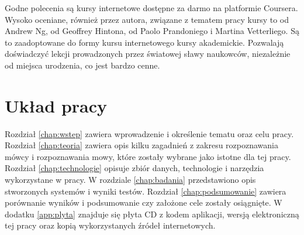 Godne polecenia są kursy internetowe dostępne za darmo na platformie Coursera.
Wysoko oceniane, również przez autora, związane z tematem pracy kursy to
 od Andrew Ng,
 od Geoffrey Hintona,
 od Paolo Prandoniego i  Martina Vetterliego.
Są to zaadoptowane do formy kursu internetowego kursy akademickie. Pozwalają
doświadczyć lekcji prowadzonych przez światowej sławy naukowców, niezależnie
od miejsca urodzenia, co jest bardzo cenne.

\section{Układ pracy}\label{sec:uklad_pracy}

Rozdział \ref{chap:wstep} zawiera wprowadzenie i określenie tematu oraz celu
pracy. Rozdział \ref{chap:teoria} zawiera opis kilku zagadnień z zakresu
rozpoznawania mówcy i rozpoznawania mowy, które zostały wybrane jako
istotne dla tej pracy. Rozdział \ref{chap:technologie}
opisuje zbiór danych, technologie i narzędzia wykorzystane w pracy. W rozdziale
\ref{chap:badania} przedstawiono opis stworzonych systemów i wyniki testów. Rozdział
\ref{chap:podsumowanie} zawiera porównanie wyników i podsumowanie czy założone
cele zostały osiągnięte. W dodatku \ref{app:plyta} znajduje się płyta CD z kodem aplikacji,
wersją elektroniczną tej pracy oraz kopią wykorzystanych źródeł internetowych.

